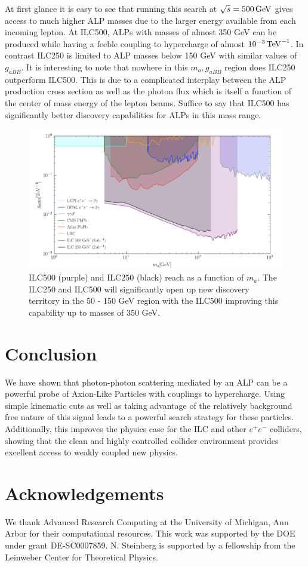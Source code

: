 \documentclass[aps,onecolumn,twoside,secnumarabic,12pt,balancelastpage,amsmath,amssymb,nofootinbib,hyperref=pdftex]{revtex4}
\begin{document}
\vskip 0.12in
At first glance it is easy to see that running this search at $\sqrt{s} = 500\,\rm{GeV}$ gives access to much higher ALP masses due to the larger energy available from each incoming lepton. At ILC500, ALPs with masses of almost 350 GeV can be produced while having a feeble coupling to hypercharge of almost $10^{-3}\,\rm{TeV}^{-1}$. In contrast ILC250 is limited to ALP masses below 150 GeV with similar values of $g_{aBB}$. It is interesting to note that nowhere in this $m_{a},g_{aBB}$ region does ILC250 outperform ILC500. This is due to a complicated interplay between the ALP production cross section as well as the photon flux which is itself a function of the center of mass energy of the lepton beams. Suffice to say that ILC500 has significantly better discovery capabilities for ALPs in this mass range. 
\begin{figure}[t]
\begin{center}
\includegraphics[width=13cm]{g_constraints_ILCfusion.png}
\caption{ILC500 (purple) and ILC250 (black) reach as a function of $m_{a}$. The ILC250 and ILC500 will significantly open up new discovery territory in the 50 - 150 GeV region with the ILC500 improving this capability up to masses of 350 GeV.}
\label{fig:constraints}
\end{center}
\end{figure}
\section{Conclusion}
We have shown that photon-photon scattering mediated by an ALP can be a powerful probe of Axion-Like Particles with couplings to hypercharge. Using simple kinematic cuts as well as taking advantage of the relatively background free nature of this signal leads to a powerful search strategy for these particles. Additionally, this improves the physics case for the ILC and other $e^{+}e^{-}$ colliders, showing that the clean and highly controlled collider environment provides excellent access to weakly coupled new physics. 

\section{Acknowledgements}
We thank Advanced Research Computing at the University of Michigan, Ann Arbor for their computational resources. This work was supported by the DOE under grant DE-SC0007859. N. Steinberg is supported by a fellowship from the Leinweber Center for Theoretical Physics.


\end{document}
